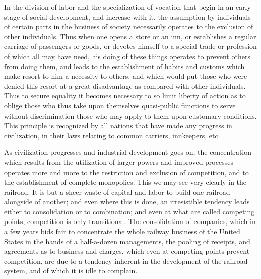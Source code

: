 \documentclass{book}
\begin{document}
In the division of labor and the specialization of vocation that begin in an early stage of social development, and increase with it, the assumption by individuals of certain parts in the business of society necessarily operates to the exclusion of other individuals. Thus when one opens a store or an inn, or establishes a regular carriage of passengers or goods, or devotes himself to a special trade or profession of which all may have need, his doing of these things operates to prevent others from doing them, and leads to the establishment of habits and customs which make resort to him a necessity to others, and which would put those who were denied this resort at a great disadvantage as compared with other individuals. Thus to secure equality it becomes necessary to so limit liberty of action as to oblige those who thus take upon themselves quasi-public functions to serve without discrimination those who may apply to them upon customary conditions. This principle is recognized by all nations that have made any progress in civilization, in their laws relating to common carriers, innkeepers, etc.

As civilization progresses and industrial development goes on, the concentration which results from the utilization of larger powers and improved processes operates more and more to the restriction and exclusion of competition, and to the establishment of complete monopolies. This we may see very clearly in the railroad. It is but a sheer waste of capital and labor to build one railroad alongside of another; and even where this is done, an irresistible tendency leads either to consolidation or to combination; and even at what are called competing points, competition is only transitional. The consolidation of companies, which in a few years bids fair to concentrate the whole railway business of the United States in the hands of a half-a-dozen managements, the pooling of receipts, and agreements as to business and charges, which even at competing points prevent competition, are due to a tendency inherent in the development of the railroad system, and of which it is idle to complain.
\end{document}
